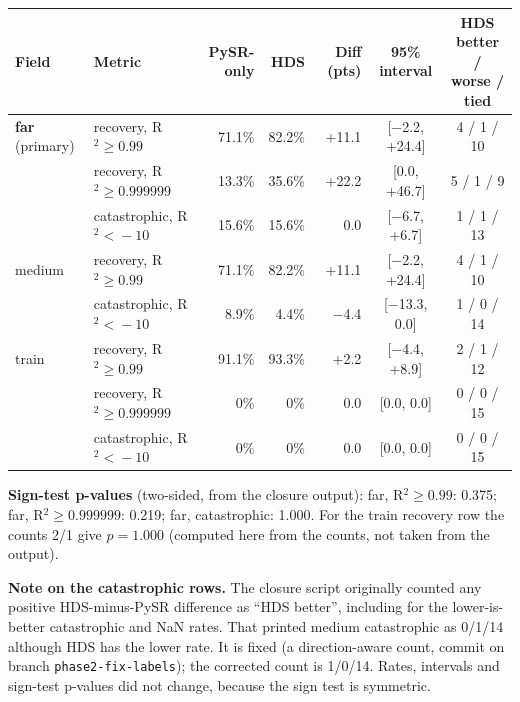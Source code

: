 \documentclass[11pt,a4paper]{article}
\newcommand{\code}[1]{\texttt{#1}}
\begin{document}
\begin{table}[ht]
\centering\footnotesize
\begin{tabular}{@{}p{1.9cm} p{3.5cm} r r r c c@{}}
\toprule
Field & Metric & PySR-only & HDS & Diff (pts) & 95\% interval & \parbox[b]{2.3cm}{\centering HDS better /\\ worse / tied} \\
\midrule
\textbf{far} (primary) & recovery, \mbox{R$^2\!\geq\!0.99$} & 71.1\% & 82.2\% & +11.1 & [−2.2, +24.4] & 4 / 1 / 10 \\
 & recovery, \mbox{R$^2\!\geq\!0.999999$} & 13.3\% & 35.6\% & +22.2 & [0.0, +46.7] & 5 / 1 / 9 \\
 & catastrophic, \mbox{R$^2\!<\!-10$} & 15.6\% & 15.6\% & 0.0 & [−6.7, +6.7] & 1 / 1 / 13 \\
\addlinespace
medium & recovery, \mbox{R$^2\!\geq\!0.99$} & 71.1\% & 82.2\% & +11.1 & [−2.2, +24.4] & 4 / 1 / 10 \\
 & catastrophic, \mbox{R$^2\!<\!-10$} & 8.9\% & 4.4\% & −4.4 & [−13.3, 0.0] & 1 / 0 / 14 \\
\addlinespace
train & recovery, \mbox{R$^2\!\geq\!0.99$} & 91.1\% & 93.3\% & +2.2 & [−4.4, +8.9] & 2 / 1 / 12 \\
 & recovery, \mbox{R$^2\!\geq\!0.999999$} & 0\% & 0\% & 0.0 & [0.0, 0.0] & 0 / 0 / 15 \\
 & catastrophic, \mbox{R$^2\!<\!-10$} & 0\% & 0\% & 0.0 & [0.0, 0.0] & 0 / 0 / 15 \\
\bottomrule
\end{tabular}
\end{table}

\textbf{Sign-test p-values} (two-sided, from the closure output): far, R$^2\ge0.99$: 0.375; far, R$^2\ge0.999999$: 0.219; far, catastrophic: 1.000. For the train recovery row the counts 2/1 give $p=1.000$ (computed here from the counts, not taken from the output).

\textbf{Note on the catastrophic rows.} The closure script originally counted any positive HDS-minus-PySR difference as ``HDS better'', including for the lower-is-better catastrophic and NaN rates. That printed medium catastrophic as 0/1/14 although HDS has the lower rate. It is fixed (a direction-aware count, commit on branch \code{phase2-fix-labels}); the corrected count is 1/0/14. Rates, intervals and sign-test p-values did not change, because the sign test is symmetric.
\end{document}

